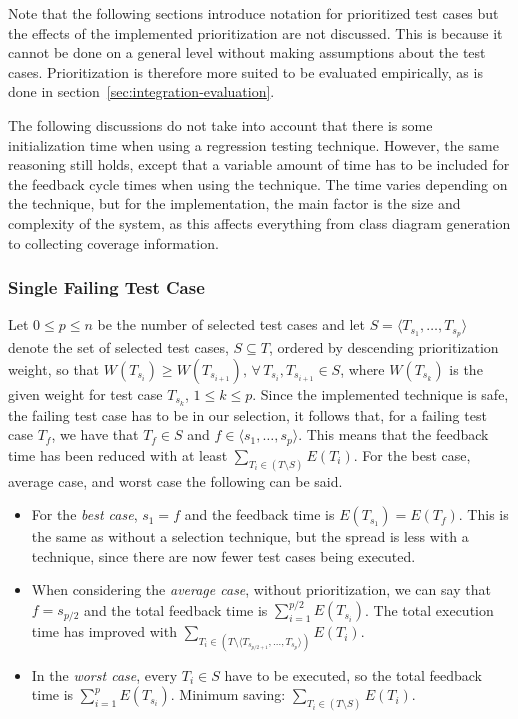 \documentclass[a4paper,english,12pt]{report}
\begin{document}
Note that the following sections introduce notation for prioritized test cases but the effects of the implemented prioritization are not discussed. This is because it cannot be done on a general level without making assumptions about the test cases. Prioritization is therefore more suited to be evaluated empirically, as is done in section~\vref{sec:integration-evaluation}.

The following discussions do not take into account that there is some initialization time when using a regression testing technique. However, the same reasoning still holds, except that a variable amount of time has to be included for the feedback cycle times when using the technique. The time varies depending on the technique, but for the implementation, the main factor is the size and complexity of the system, as this affects everything from class diagram generation to collecting coverage information.

\subsubsection{Single Failing Test Case}
Let $0 \leq p \leq n$ be the number of selected test cases and let $S = \langle T_{s_1}, \ldots, T_{s_p} \rangle$ denote the set of selected test cases, $S \subseteq T$, ordered by descending prioritization weight, so that $W(T_{s_i}) \geq W(T_{s_{i+1}}),\, \forall\, T_{s_i}, T_{s_{i+1}} \in S$, where $W(T_{s_k})$ is the given weight for test case $T_{s_k}$, $1 \leq k \leq p$. Since the implemented technique is safe, the failing test case has to be in our selection, it follows that, for a failing test case $T_f$, we have that $T_f \in S$ and $f \in \langle s_1, \ldots, s_p \rangle$. This means that the feedback time has been reduced with at least $\sum_{T_i \in (T \setminus S)} E(T_i)$. For the best case, average case, and worst case the following can be said.

\begin{itemize}
  \item For the \textit{best case}, $s_1 = f$ and the feedback time is $E(T_{s_1})=E(T_f)$. This is the same as without a selection technique, but the spread is less with a technique, since there are now fewer test cases being executed. 
  \item When considering the \textit{average case}, without prioritization, we can say that $f=s_{p/2}$ and the total feedback time is $\sum_{i=1}^{p/2} E(T_{s_i})$. The total execution time has improved with $\sum_{T_i \in (T \setminus \langle T_{s_{p/2+1}},\ldots,T_{s_{p}} \rangle)} E(T_i)$.
  \item In the \textit{worst case}, every $T_i \in S$ have to be executed, so the total feedback time is $\sum_{i=1}^{p} E(T_{s_i})$. Minimum saving: $\sum_{T_i \in (T \setminus S)} E(T_i)$.
\end{itemize}
\end{document}
